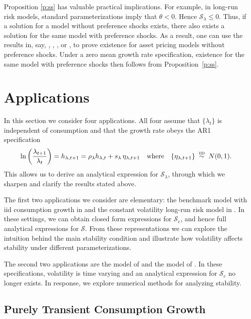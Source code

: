 \documentclass[12pt, reqno]{amsart}
\renewcommand{\leq}{\leqslant}
\newcommand{\iidsim}{\stackrel {\textrm{ {\sc iid }}} {\sim} }
\newcommand{\1}{\mathbbm 1}
\newcommand{\sS}{\mathscr S}
\theoremstyle{plain}
\theoremstyle{definition}
\begin{document}
Proposition \ref{p:ss} has valuable practical implications. For example, in
long-run risk models, standard parameterizations imply that $\theta<0$. Hence
$\sS_\lambda \leq 0$.  Thus, if a solution for a model without preference
shocks exists, there also exists a solution for the same model with preference
shocks. As a result, one can use the results in, say,
\cite{hansen2012recursive}, \cite{Pohl2019}, \cite{borovicka2020necessary}, or
\cite{christensen2022existence}, to prove existence for asset pricing models
without preference shocks. Under a zero mean growth rate specification,
existence for the same model with preference shocks then follows from
Proposition~\ref{p:ss}. 




\section{Applications}\label{s:app}

In this section we consider four applications.  All four assume that
$\{\lambda_t\}$ is independent of consumption and that the growth rate obeys
the AR1 specification
%
\begin{equation}\label{eq:lambda_ar1}
    \ln \left( \frac{\lambda_{t+1}}{\lambda_t} \right) 
    = h_{\lambda, t+1} 
    = \rho_\lambda h_{\lambda, t} + s_\lambda \, \eta_{\lambda, t+1} 
    \quad \text{where} \quad
    \{ \eta_{\lambda, t+1} \} \iidsim N(0,1).
\end{equation}
%
This allows us to derive an analytical expression for $\sS_\lambda$, through
which we sharpen and clarify the results stated above. 

The first two applications we consider are elementary: the benchmark model
with {\sc iid} consumption growth in \cite{Albuquerque2016} and the constant
volatility long-run risk model in \cite{bansal2004risks}.  In these settings,
we can obtain closed form expressions for $\sS_c$, and hence full analytical
expressions for $\sS$.  From these representations we can explore the
intuition behind the main stability condition and illustrate how volatility
affects stability under different parameterizations.

The second two applications are the model of \cite{schorfheide2018identifying}
and the model of \cite{GomezYaron2020}.  In these specifications, volatility
is time varying and an analytical expression for $\sS_c$ no longer exists.
In response, we explore numerical methods for analyzing stability.


\subsection{Purely Transient Consumption Growth}
\end{document}
